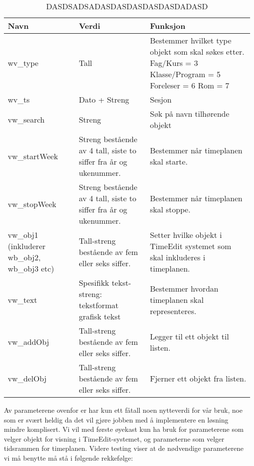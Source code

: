 \documentclass[../main.tex]{subfiles}
\begin{document}
\begin{table}[H]
\begin{center}
\caption{DASDSADSADASDASDASDASDASDADASD}
  \begin{tabular}{ | p{3cm} | p{6cm} | p{6cm} |}
    \hline
    Navn & Verdi & Funksjon \\ \hline
    wv\_type & Tall & Bestemmer hvilket type objekt som skal søkes etter. \newline Fag/Kurs = 3 \newline Klasse/Program = 5 \newline Foreleser = 6 \newline Rom = 7 \\ \hline
    wv\_ts & Dato + Streng & Sesjon \\ \hline
    vw\_search & Streng & Søk på navn tilhørende objekt \\ \hline
    vw\_startWeek & Streng bestående av 4 tall, siste to siffer fra år og ukenummer. & Bestemmer når timeplanen skal starte. \\ \hline
    vw\_stopWeek & Streng bestående av 4 tall, siste to siffer fra år og ukenummer. & Bestemmer når timeplanen skal stoppe. \\ \hline
    vw\_obj1 \newline (inkluderer wb\_obj2, \newline wb\_obj3 etc) & Tall-streng bestående av fem eller seks siffer. & Setter hvilke objekt i TimeEdit systemet som skal inkluderes i timeplanen. \\ \hline
    vw\_text & Spesifikk tekst-streng: \newline tekstformat \newline grafisk \newline tekst & Bestemmer hvordan timeplanen skal representeres. \\ \hline
    vw\_addObj & Tall-streng bestående av fem eller seks siffer. & Legger til ett objekt til listen. \\ \hline
    vw\_delObj & Tall-streng bestående av fem eller seks siffer. & Fjerner ett objekt fra listen. \\
    \hline
  \end{tabular}
\end{center}
\end{table}

Av parameterene ovenfor er har kun ett fåtall noen nytteverdi for vår bruk, noe som er svært heldig da det vil gjøre jobben med å implementere en løsning mindre komplisert.
Vi vil med første øyekast kun ha bruk for parameterene som velger objekt for visning i TimeEdit-systemet, og parameterne som velger tidsrammen for timeplanen. Videre testing viser at de nødvendige parameterene vi må benytte må stå i følgende rekkefølge:
\end{document}

